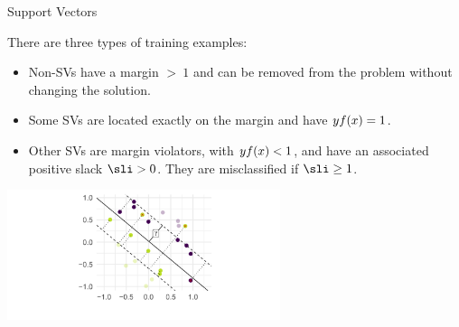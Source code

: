 \begin{vbframe}{Support Vectors}

\begin{small}
  There are three types of training examples:


\begin{itemize}
    \item Non-SVs have a margin $> ~ 1$ and can be
    removed from the problem without changing the solution.
    \item Some SVs are located exactly on the
    margin and have $yf(x)=1$.
    \item Other SVs are margin violators, with $yf(x) < 1$, 
     and have an associated positive slack $\sli > 0$. 
     They are misclassified if $\sli \geq 1$.
\end{itemize}
\end{small}

\vspace{0.1cm}
\begin{center}
\includegraphics[width = 8cm ]{figure_man/support-vec.png} \\
\end{center}


\end{vbframe}


\endlecture





